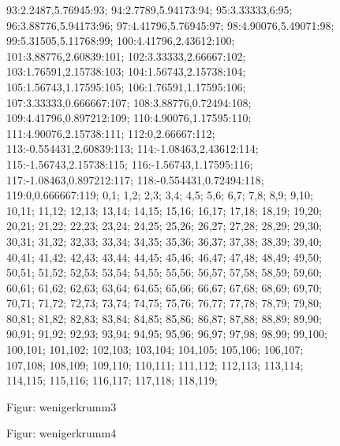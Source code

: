 \documentclass[a4paper,10pt,ngerman]{scrartcl}
\begin{document}
\begin{figure}
{    93:2.2487,5.76945:93;
    94:2.7789,5.94173:94;
    95:3.33333,6:95;
    96:3.88776,5.94173:96;
    97:4.41796,5.76945:97;
    98:4.90076,5.49071:98;
    99:5.31505,5.11768:99;
    100:4.41796,2.43612:100;
    101:3.88776,2.60839:101;
    102:3.33333,2.66667:102;
    103:1.76591,2.15738:103;
    104:1.56743,2.15738:104;
    105:1.56743,1.17595:105;
    106:1.76591,1.17595:106;
    107:3.33333,0.666667:107;
    108:3.88776,0.72494:108;
    109:4.41796,0.897212:109;
    110:4.90076,1.17595:110;
    111:4.90076,2.15738:111;
    112:0,2.66667:112;
    113:-0.554431,2.60839:113;
    114:-1.08463,2.43612:114;
    115:-1.56743,2.15738:115;
    116:-1.56743,1.17595:116;
    117:-1.08463,0.897212:117;
    118:-0.554431,0.72494:118;
    119:0,0.666667:119;
}{
0,1;
1,2;
2,3;
3,4;
4,5;
5,6;
6,7;
7,8;
8,9;
9,10;
10,11;
11,12;
12,13;
13,14;
14,15;
15,16;
16,17;
17,18;
18,19;
19,20;
20,21;
21,22;
22,23;
23,24;
24,25;
25,26;
26,27;
27,28;
28,29;
29,30;
30,31;
31,32;
32,33;
33,34;
34,35;
35,36;
36,37;
37,38;
38,39;
39,40;
40,41;
41,42;
42,43;
43,44;
44,45;
45,46;
46,47;
47,48;
48,49;
49,50;
50,51;
51,52;
52,53;
53,54;
54,55;
55,56;
56,57;
57,58;
58,59;
59,60;
60,61;
61,62;
62,63;
63,64;
64,65;
65,66;
66,67;
67,68;
68,69;
69,70;
70,71;
71,72;
72,73;
73,74;
74,75;
75,76;
76,77;
77,78;
78,79;
79,80;
80,81;
81,82;
82,83;
83,84;
84,85;
85,86;
86,87;
87,88;
88,89;
89,90;
90,91;
91,92;
92,93;
93,94;
94,95;
95,96;
96,97;
97,98;
98,99;
99,100;
100,101;
101,102;
102,103;
103,104;
104,105;
105,106;
106,107;
107,108;
108,109;
109,110;
110,111;
111,112;
112,113;
113,114;
114,115;
115,116;
116,117;
117,118;
118,119;
}
\caption{Figur: wenigerkrumm3}
        \label{fig:wenigerkrumm3}
    \end{figure}
\newpage
\begin{figure}\centering
{}
\caption{Figur: wenigerkrumm4}
        \label{fig:wenigerkrumm4}
    \end{figure}
\end{document}

